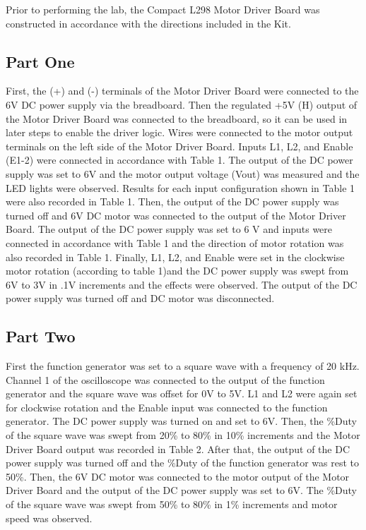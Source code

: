 Prior to performing the lab, the Compact L298 Motor Driver Board was constructed in accordance with the directions included in the Kit.

\subsection{Part One}
\label{sec:part_one}

First, the (+) and (-) terminals of the Motor Driver Board were connected to the 6V DC power supply via the breadboard. Then the regulated +5V (H) output of the Motor Driver Board was connected to the breadboard, so it can be used in later steps to enable the driver logic. Wires were connected to the motor output terminals on the left side of the Motor Driver Board. Inputs L1, L2, and Enable (E1-2) were connected in accordance with Table 1. The output of the DC power supply was set to 6V and the motor output voltage (Vout) was measured and the LED lights were observed. Results for each input configuration shown in Table 1 were also recorded in Table 1. Then, the output of the DC power supply was turned off and 6V DC motor was connected to the output of the Motor Driver Board. The output of the DC power supply was set to 6 V and inputs were connected in accordance with Table 1 and the direction of motor rotation was also recorded in Table 1. Finally, L1, L2, and Enable were set in the clockwise motor rotation (according to table 1)and the DC power supply was swept from 6V to 3V in .1V increments and the effects were observed. The output of the DC power supply was turned off and DC motor was disconnected.

\subsection{Part Two}
\label{sec:part_two}

First the function generator was set to a square wave with a frequency of 20 kHz. Channel 1 of the oscilloscope was connected to the output of the function generator and the square wave was offset for 0V to 5V. L1 and L2 were again set for clockwise rotation and the Enable input was connected to the function generator. The DC power supply was turned on and set to 6V. Then, the \%Duty of the square wave was swept from 20\% to 80\% in 10\% increments and the Motor Driver Board output was recorded in Table 2. After that, the output of the DC power supply was turned off and the \%Duty of the function generator was rest to 50\%. Then, the 6V DC motor was connected to the motor output of the Motor Driver Board and the output of the DC power supply was set to 6V. The \%Duty of the square wave was swept from 50\% to 80\% in 1\% increments and motor speed was observed.

